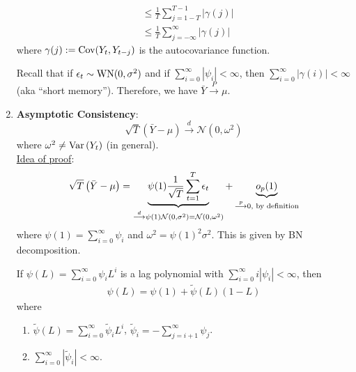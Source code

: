 \documentclass[11pt]{elegantbook}
\begin{document}
\begin{enumerate}
\begin{claim}
\begin{equation}
\begin{aligned}
                &\leq \frac{1}{T}\sum_{j=1-T}^{T-1} |\gamma(j)|\\
                &\leq\frac{1}{T}\sum_{j=-\infty}^\infty |\gamma(j)|
            \end{aligned}
            \nonumber
        \end{equation}
        where $\gamma(j):=\textnormal{Cov}(Y_t,Y_{t-j})$ is the autocovariance function.
    \end{claim}
    Recall that if $\epsilon_t\sim \textnormal{WN}(0,\sigma^2)$ and if $\sum_{i=0}^\infty|\psi_i|<\infty$, then $\sum_{i=0}^\infty |\gamma(i)|<\infty$ (aka ``short memory''). Therefore, we have $\bar{Y}\stackrel{P}{\longrightarrow}\mu$.
    \item \textbf{Asymptotic Consistency}: $$\sqrt{T}\left(\bar{Y}-\mu\right)\stackrel{d}{\longrightarrow} \mathcal{N}\left(0,\omega^2\right)$$ where $\omega^2\neq \textnormal{Var}\left(Y_t\right)$ (in general).\\
    \underline{Idea of proof}:
    \begin{equation}
        \begin{aligned}
            \sqrt{T}\left(\bar{Y}-\mu\right)=\underbrace{\psi(1)\frac{1}{\sqrt{T}}\sum_{t=1}^T\epsilon_t}_{\stackrel{d}{\longrightarrow} \psi(1)\mathcal{N}\left(0,\sigma^2\right)=\mathcal{N}\left(0,\omega^2\right)} + \underbrace{o_p(1)}_{\stackrel{p}{\longrightarrow} 0, \textnormal{ by definition}}
        \end{aligned}
        \nonumber
    \end{equation}
    where $\psi(1)=\sum_{i=0}^\infty \psi_i$ and $\omega^2=\psi(1)^2\sigma^2$. This is given by BN decomposition.
    \begin{theorem}[BN Decomposition]
        If $\psi(L)=\sum_{i=0}^\infty \psi_i L^i$ is a lag polynomial with $\sum_{i=0}^\infty i|\psi_i|<\infty$, then
        \begin{equation}
            \begin{aligned}
                \psi(L)=\psi(1)+\tilde{\psi}(L)(1-L)
            \end{aligned}
            \label{BN}
        \end{equation}
        where
        \begin{enumerate}[$\circ$]
            \item $\tilde{\psi}(L)=\sum_{i=0}^\infty \tilde{\psi}_i L^i$, $\tilde{\psi}_i=-\sum_{j=i+1}^\infty \psi_j$.
            \item $\sum_{i=0}^\infty |\tilde{\psi}_i|<\infty$.
        \end{enumerate}

\end{theorem}
\end{enumerate}
\end{document}

